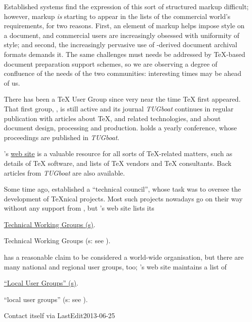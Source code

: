 Established \WYSIWYG{} systems find the expression of this sort of
structured markup difficult; however, markup \emph{is} starting to
appear in the lists of the commercial world's requirements, for two
reasons.  First, an element of markup helps impose style on a
document, and commercial users are increasingly obsessed with
uniformity of style; and second, the increasingly pervasive use of
-derived document archival formats demands it.  The same
challenges must needs be addressed by \TeX{}-based document
preparation support schemes, so we are
observing a degree of confluence of the needs of the two communities:
interesting times may be ahead of us.


There has been a \TeX{} User Group since very near the time \TeX{}
first appeared.  That first group, , is still active and its
journal \textsl{TUGboat} continues in regular publication
with articles about \TeX{}, \MF{} and related technologies, and about
document design, processing and production.   holds a yearly
conference, whose proceedings are published in \textsl{TUGboat}.

's \href{http://www.tug.org}{web site} is a valuable
resource for all sorts of
\TeX{}-related matters, such as details of \TeX{} software, and lists
of \TeX{} vendors and \TeX{} consultants.  Back articles from
\textsl{TUGboat} are also available.

Some time ago,  established a ``technical council'', whose
task was to oversee the development of \TeX{}nical projects.  Most
such projects nowadays go on their way without any support from
, but 's web site lists its

\begin{hyperversion}
\href{http://www.tug.org/twg.html}{Technical Working Groups (s)}.
\end{hyperversion}
\begin{flatversion}
Technical Working Groups (s: see
).
\end{flatversion}

 has a reasonable claim to be considered a world-wide
organisation, but there are many national and regional user groups,
too; 's web site maintains a list of
\begin{hyperversion}
\href{http://www.tug.org/lugs.html}{``Local User Groups'' (s)}.
\end{hyperversion}
\begin{flatversion}
``local user groups'' (s: see
).
\end{flatversion}

Contact  itself via 
LastEdit{2013-06-25}

